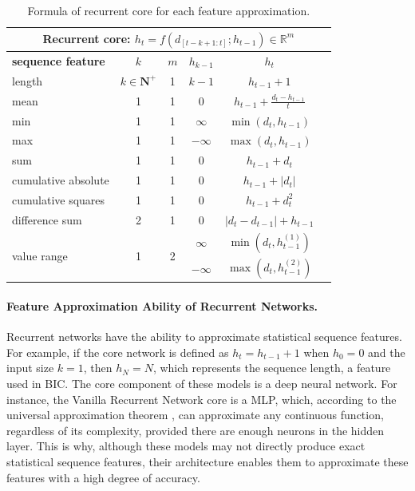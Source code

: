\documentclass[12pt]{article}
\begin{document}
\begin{table}[!t]
\centering
\begin{tabular}{lccccc}
\toprule
\multicolumn{6}{c}{Recurrent core: $h_t = f(d_{[t-k+1:t]}; h_{t-1}) \in \mathbb{R}^m$} \\ \toprule
\textbf{sequence feature} & $k$ & $m$ & $h_{k-1}$ & $h_t$
\\
\midrule
length & $k \in \mathbf{N^+}$ & 1 & $k-1$ & $h_{t-1} + 1$ \\
\cmidrule(lr){1-6}
mean & 1 & 1 & 0 & $h_{t-1} + \frac{d_t - h_{t-1}}{t}$  \\
\cmidrule(lr){1-6}
min & 1 & 1 & $\infty$ & $\min(d_t, h_{t-1})$  \\
\cmidrule(lr){1-6}
max & 1 & 1 & $-\infty$ & $\max(d_t, h_{t-1})$  \\
\cmidrule(lr){1-6}
sum & 1 & 1 & 0 & $h_{t-1} + d_t$  \\
\cmidrule(lr){1-6}
cumulative absolute & 1 & 1 & 0 & $h_{t-1} + |d_t|$  \\
\cmidrule(lr){1-6}
cumulative squares & 1 & 1 & 0 & $h_{t-1} + d_t^2$  \\
\cmidrule(lr){1-6}
difference sum & 2 & 1 & $0$ & $|d_t-d_{t-1}| + h_{t-1}$ &  \\
\cmidrule(lr){1-6}
\multirow{2}{*}{value range} & \multirow{2}{*}{1} & \multirow{2}{*}{2} & $\infty$ & $\min(d_t, h_{t-1}^{(1)})$ & \multirow{2}{*}{} \\
                             &   &   & $-\infty$  & $\max(d_t, h_{t-1}^{(2)})$ & \\
\bottomrule
\end{tabular}
\caption{Formula of recurrent core for each feature approximation.}
\label{tab:feature_approximation}
\end{table}

\paragraph{Feature Approximation Ability of Recurrent Networks.}
Recurrent networks have the ability to approximate statistical sequence features. For example, if the core network is defined as \( h_t = h_{t-1} + 1 \) when \( h_0 = 0 \) and the input size $k = 1$, then \( h_N = N \), which represents the sequence length, a feature used in BIC. 
The core component of these models is a deep neural network. 
For instance, the Vanilla Recurrent Network \citep{rnn} core is a MLP, which, according to the universal approximation theorem \citep{uni_approximator}, can approximate any continuous function, regardless of its complexity, provided there are enough neurons in the hidden layer. 
This is why, although these models may not directly produce exact statistical sequence features, their architecture enables them to approximate these features with a high degree of accuracy.
\end{document}
